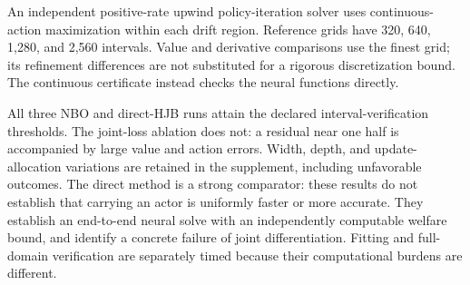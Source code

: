 An independent positive-rate upwind policy-iteration solver uses continuous-action maximization within each drift region. Reference grids have 320, 640, 1,280, and 2,560 intervals. Value and derivative comparisons use the finest grid; its refinement differences are not substituted for a rigorous discretization bound. The continuous certificate instead checks the neural functions directly.

All three NBO and direct-HJB runs attain the declared interval-verification thresholds. The joint-loss ablation does not: a residual near one half is accompanied by large value and action errors. Width, depth, and update-allocation variations are retained in the supplement, including unfavorable outcomes. The direct method is a strong comparator: these results do not establish that carrying an actor is uniformly faster or more accurate. They establish an end-to-end neural solve with an independently computable welfare bound, and identify a concrete failure of joint differentiation. Fitting and full-domain verification are separately timed because their computational burdens are different.
